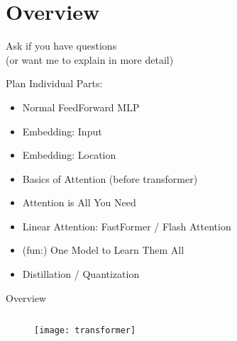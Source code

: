 \section{Overview}

\begin{frame}[standout]
    \Large
    Ask if you have questions \\
    (or want me to explain in more detail)
\end{frame}

\begin{frame}[c]{Plan}
    Individual Parts:
    \begin{itemize}[<+(1)->]
        \item Normal FeedForward MLP
        \item Embedding: Input
        \item Embedding: Location
        \item Basics of Attention (before transformer)
        \item Attention is All You Need \cite{vaswani_attention_2017}
        \item Linear Attention: FastFormer \cite{wu_fastformer_2021} / Flash Attention \cite{hua_transformer_2022}

        \item (fun:) One Model to Learn Them All \cite{kaiser_one_2017}
        \item Distillation / Quantization \cite{polino_model_2018}
    \end{itemize}
\end{frame}


\begin{frame}[c]{Overview}
    \begin{figure}
        \begin{columns}
            \texttt{[image: transformer]}
        \end{columns}
    \end{figure}
\end{frame}
